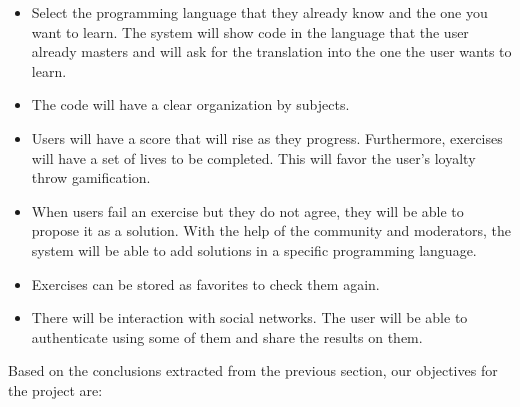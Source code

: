 \begin{itemize}
\item
Select the programming language that they already know and the one you want to learn. The system will show code in the language that the user already masters and will ask for the translation into the one the user wants to learn.

\item
The code will have a clear organization by subjects.

\item
Users will have a score that will rise as they progress. Furthermore, exercises will have a set of lives to be completed. This will favor the user's loyalty throw gamification.

\item
When users fail an exercise but they do not agree, they will be able to propose it as a solution. With the help of the community and moderators, the system will be able to add solutions in a specific programming language. 

\item
Exercises can be stored as favorites to check them again.

\item
There will be interaction with social networks. The user will be able to authenticate using some of them and share the results on them. 

\end{itemize}
Based on the conclusions extracted from the previous section, our objectives for the project are:

